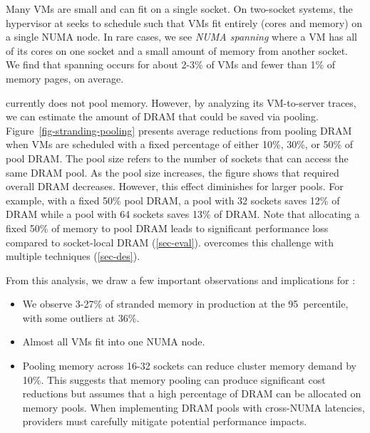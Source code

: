  Many VMs are small and can fit on a
single socket.  On two-socket systems, the hypervisor at \azure seeks to
schedule such that VMs fit entirely (cores and memory) on a single NUMA node.  In
rare cases, we see \emph{NUMA spanning} where a VM has all of its
cores on one socket and a small amount of memory from
another socket.
We find that spanning occurs for about 2-3\% of VMs and fewer than
1\% of memory pages, on average.

\azure currently does not pool memory.  However, by analyzing
its VM-to-server traces, we can estimate the amount of DRAM that could
be saved via pooling.  Figure~\ref{fig-stranding-pooling} presents
average reductions from pooling DRAM when VMs are scheduled with a
fixed percentage of either 10\%, 30\%, or 50\% of pool DRAM. The pool
size refers to the number of sockets that can access the same DRAM
pool. As the pool size increases, the figure shows that required
overall DRAM decreases.  However, this effect diminishes for larger
pools.  For example, with a fixed 50\% pool DRAM, a
pool with 32 sockets saves 12\% of DRAM while a pool with 64 sockets
saves 13\% of DRAM.
Note that
allocating a fixed 50\% of memory to pool DRAM leads to significant
performance loss compared to socket-local DRAM (\sec\ref{sec-eval}).
\sys overcomes this challenge with multiple techniques (\sec\ref{sec-des}).

  From this analysis, we draw a
few important observations and implications for \sys:

\begin{itemize}

\item We observe 3-27\% of stranded memory in production at the 95\th\ percentile, with
    some outliers at 36\%.

\item Almost all VMs fit into one NUMA node.

\item Pooling memory across 16-32 sockets can reduce cluster memory
    demand by 10\%.  This suggests that memory pooling can
        produce significant cost reductions but assumes that a high
        percentage of DRAM can be allocated on memory pools.  When
        implementing DRAM pools with cross-NUMA latencies, providers
        must carefully mitigate potential performance impacts. \border{}

\end{itemize}


